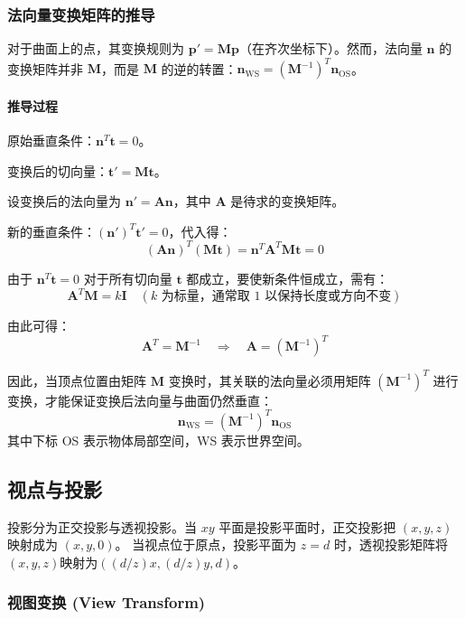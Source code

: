 \documentclass[12pt]{article}
\begin{document}
\subsubsection{法向量变换矩阵的推导}

对于曲面上的点，其变换规则为 $\mathbf{p}' = \mathbf{M} \mathbf{p}$（在齐次坐标下）。然而，法向量 $\mathbf{n}$ 的变换矩阵并非 $\mathbf{M}$，而是 $\mathbf{M}$ 的逆的转置：$\mathbf{n}_{\text{WS}} = (\mathbf{M}^{-1})^T \mathbf{n}_{\text{OS}}$。

\paragraph{推导过程}
    原始垂直条件：$\mathbf{n}^T \mathbf{t} = 0$。

    变换后的切向量：$\mathbf{t}' = \mathbf{M} \mathbf{t}$。

    设变换后的法向量为 $\mathbf{n}' = \mathbf{A} \mathbf{n}$，其中 $\mathbf{A}$ 是待求的变换矩阵。

    新的垂直条件：$(\mathbf{n}')^T \mathbf{t}' = 0$，代入得：
    \[
    (\mathbf{A} \mathbf{n})^T (\mathbf{M} \mathbf{t}) = \mathbf{n}^T \mathbf{A}^T \mathbf{M} \mathbf{t} = 0
    \]

    由于 $\mathbf{n}^T \mathbf{t} = 0$ 对于所有切向量 $\mathbf{t}$ 都成立，要使新条件恒成立，需有：
    \[
    \mathbf{A}^T \mathbf{M} = k \mathbf{I} \quad (\text{$k$ 为标量，通常取 1 以保持长度或方向不变})
    \]
    
    由此可得：
    \[
    \mathbf{A}^T = \mathbf{M}^{-1} \quad \Rightarrow \quad \mathbf{A} = (\mathbf{M}^{-1})^T
    \]

因此，当顶点位置由矩阵 $\mathbf{M}$ 变换时，其关联的法向量必须用矩阵 $(\mathbf{M}^{-1})^T$ 进行变换，才能保证变换后法向量与曲面仍然垂直：
\[
\boxed{\mathbf{n}_{\text{WS}} = (\mathbf{M}^{-1})^T \mathbf{n}_{\text{OS}}}
\]
其中下标 OS 表示物体局部空间，WS 表示世界空间。

\subsection{视点与投影}

投影分为正交投影与透视投影。当 $xy$ 平面是投影平面时，正交投影把 $(x, y, z)$ 映射成为 $(x, y, 0)$。
当视点位于原点，投影平面为 $z = d$ 时，透视投影矩阵将$(x,y,z)$映射为$((d/z)x, (d/z)y, d)$。

\subsubsection*{视图变换 (View Transform)}
\end{document}
